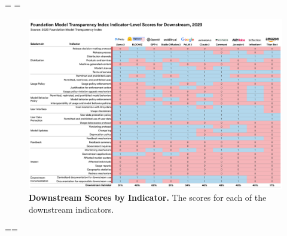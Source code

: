 \eject
\pdfpageheight=\originalwidth
\setlength{\mylength}{\originalheight-3.4cm}
\pdfpagewidth=\mylength
{}

\begin{figure}
\begin{minipage}{\pdfpagewidth}
\includegraphics[keepaspectratio, width=0.85\pdfpagewidth]{figures/f12.pdf}
\end{minipage}
\caption{\textbf{Downstream Scores by Indicator.} 
The scores for each of the \numdownstreamindicators downstream indicators.
}
\label{fig:downstream-scores}
\end{figure}

\clearpage

\eject
\pdfpagewidth=\originalwidth \pdfpageheight=\originalheight
{}


